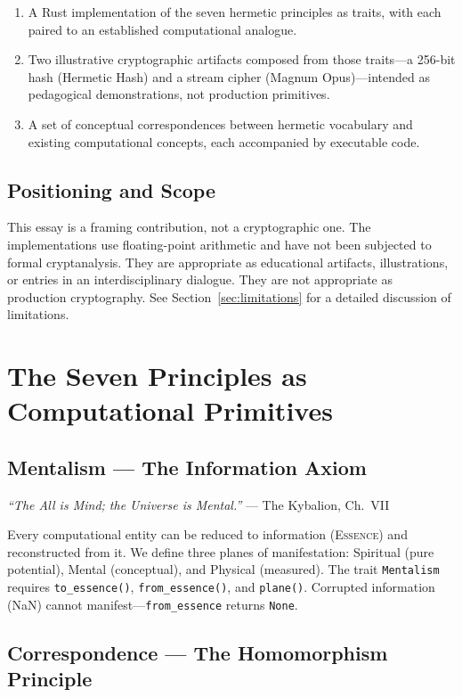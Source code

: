 \documentclass[sigplan,anonymous=false]{acmart}
\begin{document}
\begin{enumerate}[nosep]
  \item A Rust implementation of the seven hermetic principles as traits, with each paired to an established computational analogue.
  \item Two illustrative cryptographic artifacts composed from those traits---a 256-bit hash (Hermetic Hash) and a stream cipher (Magnum Opus)---intended as pedagogical demonstrations, not production primitives.
  \item A set of conceptual correspondences between hermetic vocabulary and existing computational concepts, each accompanied by executable code.
\end{enumerate}

\subsection{Positioning and Scope}

This essay is a framing contribution, not a cryptographic one. The implementations use floating-point arithmetic and have not been subjected to formal cryptanalysis. They are appropriate as educational artifacts, illustrations, or entries in an interdisciplinary dialogue. They are not appropriate as production cryptography. See Section~\ref{sec:limitations} for a detailed discussion of limitations.

\section{The Seven Principles as Computational Primitives}

\subsection{Mentalism --- The Information Axiom}

\emph{``The All is Mind; the Universe is Mental.''} --- The Kybalion, Ch.~VII

Every computational entity can be reduced to information (\textsc{Essence}) and reconstructed from it. We define three planes of manifestation: Spiritual (pure potential), Mental (conceptual), and Physical (measured). The trait \texttt{Mentalism} requires \texttt{to\_essence()}, \texttt{from\_essence()}, and \texttt{plane()}. Corrupted information (NaN) cannot manifest---\texttt{from\_essence} returns \texttt{None}.

\subsection{Correspondence --- The Homomorphism Principle}
\end{document}
